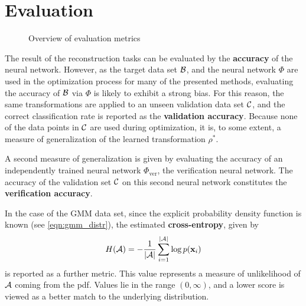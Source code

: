 \section{Evaluation}
\label{sec:evaluation}

\begin{figure}[ht]
    \centering
    
    \caption{Overview of evaluation metrics}
    \label{fig:evaluation_overview}
    \centering
\end{figure}

The result of the reconstruction tasks can be evaluated by the \textbf{accuracy}
of the neural network. However, as
the target data set $\mathcal B$, 
and the neural network $\Phi$
are used in the optimization process
for many of the presented methods,
evaluating the accuracy of $\mathcal B$ via $\Phi$ is likely to exhibit a strong bias.
For this reason, the same transformations are applied to an unseen
validation data set $\mathcal C$, and the 
correct classification rate is reported as the \textbf{validation accuracy}. 
Because none of the data points in $\mathcal C$
are used during optimization, it is, to some extent, a measure of generalization
of the learned transformation $\rho^*$.

A second measure of generalization is given by evaluating the accuracy of an
independently trained neural network $\Phi_\text{ver}$, the verification neural network.
The accuracy of the validation set $\mathcal C$ on this second neural network 
constitutes the \textbf{verification accuracy}.

In the case of the GMM data set, since the explicit probability density function is known 
(see \ref{eqn:gmm_distr}), the estimated \textbf{cross-entropy}, given by
\begin{equation}
\label{eqn:cross_entropy}
    H(\mathcal A) = - \frac 1 {|\mathcal A|} \sum_{i=1}^{|\mathcal A|} \log p(\mathbf x_i)
\end{equation}
is reported as a further metric.
This value represents a measure of unlikelihood of $\mathcal A$ 
coming from the pdf.
Values lie in the range $(0,\infty)$, 
and a lower score is viewed as a better 
match to the underlying distribution.


